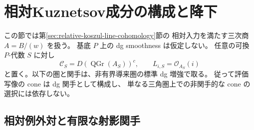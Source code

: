 \section{相対Kuznetsov成分の構成と降下}
\label{sec:relative-kuznetsov-construction}

この節では第\ref{sec:relative-koszul-line-cohomology}節の
相対入力を満たす三次商 $A=B/(w)$ を扱う。
基底 $P$ 上の dg smoothness は仮定しない。
任意の可換 $P$-代数 $S$ に対し
\[
 \mathcal C_S=D(\operatorname{QGr}(A_S))^c,
 \qquad L_{i,S}=\mathcal O_{A_S}(i)
\]
と置く。以下の圏と関手は、非有界導来圏の標準 dg 増強で取る。
従って評価写像の cone は dg 関手として構成し、
単なる三角圏上での非関手的な cone の選択には依存しない。

\subsection{相対例外対と有限な射影関手}

